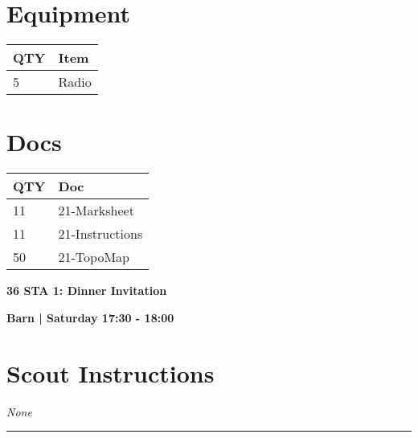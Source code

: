 \documentclass[10pt]{article}
\newcommand{\newtitle}[1]{\begin{center}{\Huge\bfseries #1 }\\ \vspace{5mm}\end{center}}
\newcommand{\newsubtitle}[1]{\begin{center}{\color{grey}\Large\bfseries #1 }\\ \vspace{5mm}\end{center}}
\begin{document}
	\begin{multicols}{2}

		\section*{\faWrench \: Equipment}

		
	\begin{center}
			\begin{tabular}{p{2cm}p{4cm}}


				\textbf{QTY} & \textbf{Item} \\\toprule
												5&Radio\\\midrule
								\end{tabular}

			\end{center}

		
		\vfill\null
		\columnbreak

			\section*{\faFile \: Docs}
		 	\begin{center}
			\begin{tabular}{p{2cm}p{4cm}}

			\textbf{QTY} & \textbf{Doc} \\\toprule
										11&21-Marksheet\\\midrule
										11&21-Instructions\\\midrule
										50&21-TopoMap\\\midrule
							\end{tabular}
			\end{center}
	

		\vfill\null

		\end{multicols}



	\vspace{1cm}


	\clearpage
		\newtitle{36 STA 1: Dinner Invitation }
	\newsubtitle{Barn | Saturday 17:30 - 18:00}
		\setcounter{section}{35}
	\section*{Scout Instructions}
		\textit{None}
	
	\vspace{0.5cm}
	\hrule
	\vspace{0.5cm}
\end{document}
